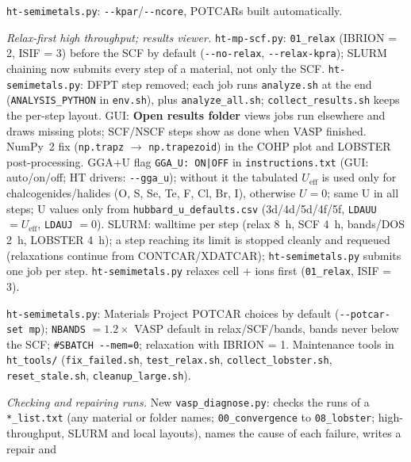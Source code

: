 \documentclass[11pt,a4paper]{scrartcl}
\begin{document}
\begin{description}
    \texttt{ht-semimetals.py}: \texttt{-{}-kpar}/\texttt{-{}-ncore}, POTCARs
    built automatically.
  \item[\textcolor{mainblue}{v2.2} (2026-09-30)]
    \textit{Relax-first high throughput; results viewer.}
    \texttt{ht-mp-scf.py}: \texttt{01\_relax} (IBRION = 2, ISIF = 3) before
    the SCF by default (\texttt{-{}-no-relax}, \texttt{-{}-relax-kpra}); SLURM
    chaining now submits every step of a material, not only the SCF.
    \texttt{ht-semimetals.py}: DFPT step removed; each job runs
    \texttt{analyze.sh} at the end (\texttt{ANALYSIS\_PYTHON} in
    \texttt{env.sh}), plus \texttt{analyze\_all.sh}; \texttt{collect\_results.sh}
    keeps the per-step layout.  GUI: \textbf{Open results folder} views jobs
    run elsewhere and draws missing plots; SCF/NSCF steps show as done when
    VASP finished.  NumPy~2 fix (\texttt{np.trapz} $\to$ \texttt{np.trapezoid})
    in the COHP plot and LOBSTER post-processing.
    GGA+U flag \texttt{GGA\_U: ON|OFF} in \texttt{instructions.txt} (GUI:
    auto/on/off; HT drivers: \texttt{-{}-gga\_u}); without it the tabulated
    $U_{\mathrm{eff}}$ is used only for chalcogenides/halides (O, S, Se, Te,
    F, Cl, Br, I), otherwise $U=0$; same U in all steps; U values only from
    \texttt{hubbard\_u\_defaults.csv} (3d/4d/5d/4f/5f, \texttt{LDAUU}
    $= U_{\mathrm{eff}}$, \texttt{LDAUJ} $=0$).
    SLURM: walltime per step (relax 8~h, SCF 4~h, bands/DOS 2~h, LOBSTER
    4~h); a step reaching its limit is stopped cleanly and requeued
    (relaxations continue from CONTCAR/XDATCAR); \texttt{ht-semimetals.py}
    submits one job per step.
    \texttt{ht-semimetals.py} relaxes cell + ions first (\texttt{01\_relax},
    ISIF = 3).
  \item[\textcolor{mainblue}{v2.3} (2026-10-05)]
    \texttt{ht-semimetals.py}: Materials Project POTCAR choices by default
    (\texttt{-{}-potcar-set mp}); \texttt{NBANDS} $= 1.2\times$ VASP default in
    relax/SCF/bands, bands never below the SCF; \texttt{\#SBATCH -{}-mem=0};
    relaxation with IBRION = 1.  Maintenance tools in \texttt{ht\_tools/}
    (\texttt{fix\_failed.sh}, \texttt{test\_relax.sh}, \texttt{collect\_lobster.sh},
    \texttt{reset\_stale.sh}, \texttt{cleanup\_large.sh}).
  \item[\textcolor{mainblue}{v2.4} (2026-10-12)]
    \textit{Checking and repairing runs.}
    New \texttt{vasp\_diagnose.py}: checks the runs of a \texttt{*\_list.txt} (any material
    or folder names; \texttt{00\_convergence} to \texttt{08\_lobster}; high-throughput,
    SLURM and local layouts), names the cause of each failure, writes a repair and

\end{description}
\end{document}
